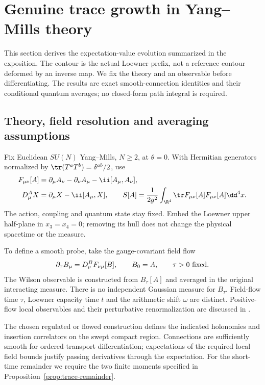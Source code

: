 \section{Genuine trace growth in Yang--Mills theory}
\label{sec:trace-hierarchy}

This section derives the expectation-value evolution summarized
in the exposition. The contour is the actual Loewner prefix, not
a reference contour deformed by an inverse map. We fix the theory
and an observable before differentiating. The results are exact
smooth-connection identities and their conditional quantum
averages; no closed-form path integral is required.

\subsection{Theory, field resolution and averaging assumptions}

Fix Euclidean $SU(N)$ Yang--Mills, $N\ge2$, at $\theta=0$.
With Hermitian generators normalized by
$\tr(T^aT^b)=\delta^{ab}/2$, use
\begin{align}\label{eq:trace-action}
 F_{\mu\nu}[A]&=\partial_\mu A_\nu-\partial_\nu A_\mu
                         -\ii[A_\mu,A_\nu],\\
 D_\mu^A X&=\partial_\mu X-\ii[A_\mu,X],\qquad
 S[A]=\frac1{2g^2}\int_{\R^4}\tr F_{\mu\nu}[A]F_{\mu\nu}[A]\dd^4x.
 \notag
\end{align}
The action, coupling and quantum state stay fixed. Embed the
Loewner upper half-plane in $x_3=x_4=0$; removing its hull does
not change the physical spacetime or the measure.

To define a smooth probe, take the gauge-covariant field flow
\begin{equation}\label{eq:trace-field-flow}
 \partial_\tau B_\mu=D_\nu^B F_{\nu\mu}[B],\qquad B_0=A,
 \qquad \tau>0\ \hbox{fixed}.
\end{equation}
The Wilson observable is constructed from $B_\tau[A]$ and averaged
in the original interacting measure. There is no independent
Gaussian measure for $B_\tau$. Field-flow time $\tau$, Loewner
capacity time $t$ and the arithmetic shift $\omega$ are distinct.
Positive-flow local observables and their perturbative
renormalization are discussed in
\cite{LuscherFlow,LuscherWeiszFlow}.

\begin{assumption}
\label{ass:trace-regularity}
The chosen regulated or flowed construction defines the indicated
holonomies and insertion correlators on the swept compact region.
Connections are sufficiently smooth for ordered-transport
differentiation; expectations of the required local field bounds
justify passing derivatives through the expectation. For the
short-time remainder we require the two finite moments specified
in Proposition~\ref{prop:trace-remainder}.
\end{assumption}

